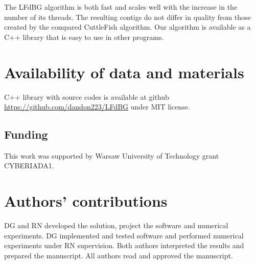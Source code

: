 \documentclass[12pt]{article}
\begin{document}
The LFdBG algorithm is both fast and scales well with the increase in the number of its threads. The resulting contigs do not differ in quality from those created by the compared CuttleFish algorithm. Our algorithm is available as a C++ library that is easy to use in other programs.

\section{Availability of data and materials}%

C++ library with source codes is available at github \url{https://github.com/dandon223/LFdBG} under MIT license.

\subsection{Funding}%

This work was supported by Warsaw University of Technology grant CYBERIADA1.

\section{Authors' contributions}

DG and RN developed the solution, project the software and numerical experiments. DG implemented and tested software and performed numerical experiments under RN supervision. Both authors interpreted the results and prepared the manuscript. All authors read and approved the manuscript.




\end{document}
